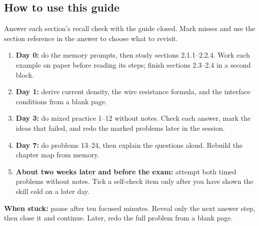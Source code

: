 \documentclass[11pt]{article}
\begin{document}
\begin{keepsection}
\section{How to use this guide}

Answer each section's recall check with the guide closed. Mark misses and use the section reference in the answer to choose what to revisit.

\begin{enumerate}
\item \textbf{Day 0:} do the memory prompts, then study sections 2.1.1–2.2.4. Work each example on paper before reading its steps; finish sections 2.3–2.4 in a second block.
\item \textbf{Day 1:} derive current density, the wire resistance formula, and the interface conditions from a blank page.
\item \textbf{Day 3:} do mixed practice 1–12 without notes. Check each answer, mark the ideas that failed, and redo the marked problems later in the session.
\item \textbf{Day 7:} do problems 13–24, then explain the questions aloud. Rebuild the chapter map from memory.
\item \textbf{About two weeks later and before the exam:} attempt both timed problems without notes. Tick a self-check item only after you have shown the skill cold on a later day.
\end{enumerate}

\begin{notebox}\textbf{When stuck:} pause after ten focused minutes. Reveal only the next answer step, then close it and continue. Later, redo the full problem from a blank page.\end{notebox}
\end{keepsection}
\end{document}

